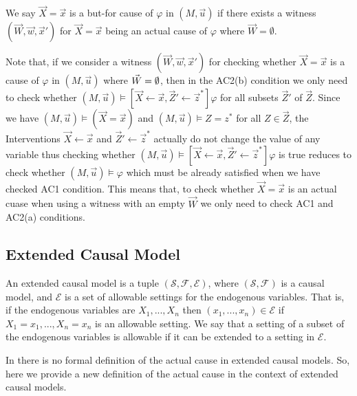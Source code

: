 \begin{definition}
    We say $\vec X = \vec x$ is a but-for cause of $\varphi$ in
    $(M,\vec u)$ if there exists a witness $(\vec W, \vec w, \vec x')$
    for $\vec X = \vec x$ being an actual cause of $\varphi$
    where $\vec W = \emptyset $.
\end{definition}

Note that, if we consider a witness $(\vec W, \vec w, \vec x')$
for checking whether $\vec X = \vec x$ is a cause of $\varphi$
in $(M,\vec u)$ where $\vec W = \emptyset$, then in the AC2(b) condition
we only need to check whether $(M,\vec u) \vDash [\vec X \leftarrow \vec x, \vec Z' \leftarrow \vec z^*]\varphi$ for all subsets $\vec Z'$
of $\vec Z$.
Since we have $(M,\vec u) \vDash (\vec X = \vec x)$ and
$(M,\vec u) \vDash Z = z^*$ for all $Z \in \vec Z$,
the Interventions $\vec X \leftarrow \vec x$ and
$\vec Z ' \leftarrow \vec z^*$ actually do not change the value of
any variable thus checking whether
$(M,\vec u) \vDash [\vec X \leftarrow \vec x, \vec Z' \leftarrow \vec z^*]\varphi$ is true
reduces to check whether $(M,\vec u) \vDash \varphi$
which must be already satisfied when we have checked AC1 condition.
This means that, to check whether $\vec X = \vec x$ is an actual cuase when using a witness with an empty $\vec W$
we only need to check AC1 and AC2(a) conditions.
\subsection{Extended Causal Model}
An extended causal model is a tuple $(\mathcal{S},\mathcal{F},
    \mathcal{E})$, where $(\mathcal{S},\mathcal{F})$ is a causal model, and $\mathcal{E}$ is a set of allowable settings for the endogenous variables.
That is, if the endogenous variables are $X_1,...,X_n$ then
$(x_1,...,x_n) \in \mathcal{E}$ if $X_1 = x_1, ..., X_n=x_n$ is an
allowable setting.
We say that a setting of a subset of the endogenous variables is allowable if it can be extended to a setting in $\mathcal{E}$.

In \cite{hp} there is no formal definition of the actual cause 
in extended causal models.
So, here we provide a new definition of the actual cause 
in the context of extended causal models.


